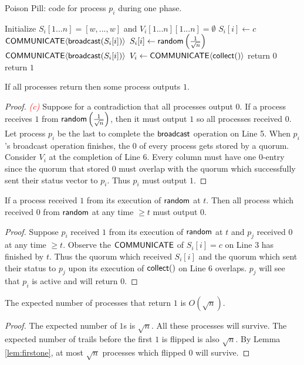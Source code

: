 \documentclass[
10pt, %
letterpaper, %
onecolumn, %
]{article}
\begin{document}
\begin{algorithm}[ht]
	\caption{Poison Pill: code for process $p_i$ during one phase.}
    \label{pseudocode:homPP}
    \begin{algorithmic}[1]
    \State Initialize $S_i[1...n] = [w, ... ,w]$ and $V_i[1...n][1...n] = \emptyset$
	\State $S_i[i] \leftarrow c$
	\State $\mathsf{COMMUNICATE}\langle\mathsf{broadcast}(S_i[i])\rangle$
	\State $S_i[i] \leftarrow \mathsf{random}\left(\frac{1}{\sqrt{n}}\right)$
	\State $\mathsf{COMMUNICATE}\langle\mathsf{broadcast}(S_i[i])\rangle$
	\State $V_i \leftarrow \mathsf{COMMUNICATE}\langle\mathsf{collect}()\rangle$
		\State return $0$
	\EndIf
	\State return $1$ 
	\end{algorithmic}
\end{algorithm}

\begin{claim}
If all processes return then some process outputs $1$.
\end{claim}
\begin{proof}
\textcolor{red}{\emph{(c)}} Suppose for a contradiction that all processes output $0$. If a process receives $1$ from $\mathsf{random}\left(\frac{1}{\sqrt{n}}\right)$, then it must output $1$ so all processes received $0$. Let process $p_i$ be the last to complete the $\mathsf{broadcast}$ operation on Line 5. When $p_i$'s broadcast operation finishes, the $0$ of every process gets stored by a quorum. Consider $V_i$ at the completion of Line 6. Every column must have one $0$-entry since the quorum that stored $0$ must overlap with the quorum which successfully sent their status vector to $p_i$. Thus $p_i$ must output $1$. 
\end{proof}

\begin{lemma}
\label{lem:firstone}
If a process received $1$ from its execution of $\mathsf{random}$ at $t$. Then all process which received $0$ from $\mathsf{random}$ at any time $\geq t$ must output $0$. 
\end{lemma}
\begin{proof}
Suppose $p_i$ received $1$ from its execution of $\mathsf{random}$ at $t$ and $p_j$ received $0$ at any time $\geq t$. Observe the $\mathsf{COMMUNICATE}$ of $S_i[i] = c$ on Line 3 has finished by $t$. Thus the quorum which received $S_i[i]$ and the quorum which sent their status to $p_j$ upon its execution of $\mathsf{collect}()$ on Line 6 overlaps. $p_j$ will see that $p_i$ is active and will return $0$. 
\end{proof}

\begin{claim}
\label{claim:expected}
The expected number of processes that return $1$ is $O(\sqrt{n})$.
\end{claim}
\begin{proof}
The expected number of $1$s is $\sqrt{n}$. All these processes will survive. The expected number of trails before the first $1$ is flipped is also $\sqrt{n}$. By Lemma \ref{lem:firstone}, at most $\sqrt{n}$ processes which flipped $0$ will survive.  
\end{proof}
\end{document}
